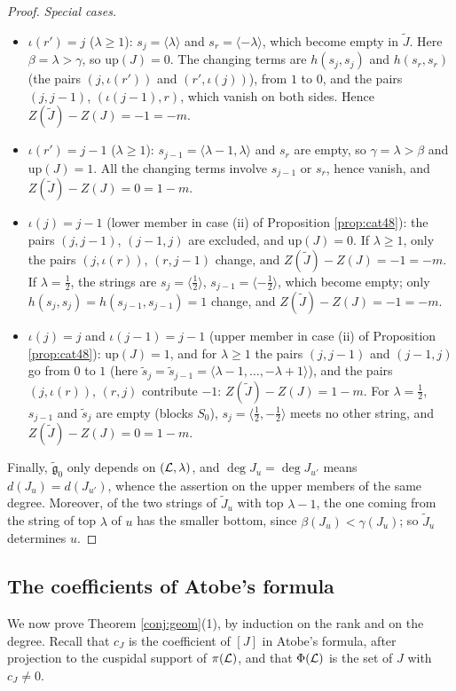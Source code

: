 \documentclass[a4paper,12pt,leqno]{amsart}
\theoremstyle{plain}
\theoremstyle{definition}
\begin{document}
\begin{proof}
\emph{Special cases.}
\begin{itemize}
\item $\iota(r')=j$ ($\lambda\geq1$): $s_j=\langle\lambda\rangle$ and $s_r=\langle-\lambda\rangle$, which
become empty in $\widetilde J$. Here $\beta=\lambda>\gamma$, so $\mathrm{up}(J)=0$. The changing terms are
$h(s_j,s_j)$ and $h(s_r,s_r)$ (the pairs $(j,\iota(r'))$ and $(r',\iota(j))$), from $1$ to $0$, and the
pairs $(j,j-1)$, $(\iota(j-1),r)$, which vanish on both sides. Hence $Z(\widetilde J)-Z(J)=-1=-m$.
\item $\iota(r')=j-1$ ($\lambda\geq1$): $s_{j-1}=\langle\lambda-1,\lambda\rangle$ and $s_r$ are empty, so
$\gamma=\lambda>\beta$ and $\mathrm{up}(J)=1$. All the changing terms involve $s_{j-1}$ or $s_r$, hence
vanish, and $Z(\widetilde J)-Z(J)=0=1-m$.
\item $\iota(j)=j-1$ (lower member in case (ii) of Proposition \ref{prop:cat48}): the pairs $(j,j-1)$, $(j-1,j)$ are excluded, and
$\mathrm{up}(J)=0$. If $\lambda\geq1$, only the pairs $(j,\iota(r))$, $(r,j-1)$ change, and
$Z(\widetilde J)-Z(J)=-1=-m$. If $\lambda=\tfrac12$, the strings are $s_j=\langle\tfrac12\rangle$,
$s_{j-1}=\langle-\tfrac12\rangle$, which become empty; only $h(s_j,s_j)=h(s_{j-1},s_{j-1})=1$ change, and
$Z(\widetilde J)-Z(J)=-1=-m$.
\item $\iota(j)=j$ and $\iota(j-1)=j-1$ (upper member in case (ii) of Proposition \ref{prop:cat48}): $\mathrm{up}(J)=1$, and for $\lambda\geq1$
the pairs $(j,j-1)$ and $(j-1,j)$ go from $0$ to $1$ (here $\widetilde s_j=\widetilde s_{j-1}=\langle
\lambda-1,\ldots,-\lambda+1\rangle$), and the pairs $(j,\iota(r))$, $(r,j)$ contribute $-1$:
$Z(\widetilde J)-Z(J)=1-m$. For $\lambda=\tfrac12$, $s_{j-1}$ and $\widetilde s_j$ are empty (blocks
$S_0$), $s_j=\langle\tfrac12,-\tfrac12\rangle$ meets no other string, and $Z(\widetilde J)-Z(J)=0=1-m$.
\end{itemize}
Finally, $\widetilde{\mathfrak g}_0$ only depends on $(\mathcal{L},\lambda)$, and $\deg J_u=\deg J_{u'}$ means
$d(J_u)=d(J_{u'})$, whence the assertion on the upper members of the same degree. Moreover, of the two strings
of $\widetilde J_u$ with top $\lambda-1$, the one coming from the string of top $\lambda$ of $u$ has the
smaller bottom, since $\beta(J_u)<\gamma(J_u)$; so $\widetilde J_u$ determines $u$.
\end{proof}

\subsection{The coefficients of Atobe's formula}\label{ssec:signs}
We now prove Theorem \ref{conj:geom}(1), by induction on the rank and on the degree. Recall that
$c_J$ is the coefficient of $[J]$ in Atobe's formula, after projection to the cuspidal support of
$\pi(\mathcal{L})$, and that $\Phi(\mathcal{L})$ is the set of $J$ with $c_J\neq0$.
\end{document}
